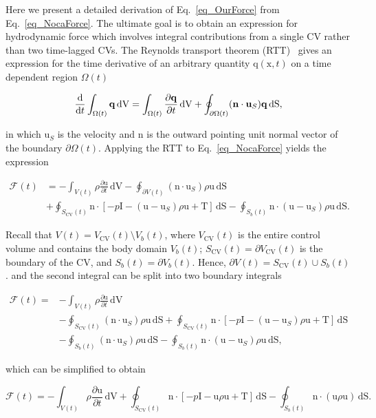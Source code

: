 \documentclass[review]{elsarticle}
\renewcommand \d [2]{\frac{{\rm d} #1}{{\rm d} #2}}
\newcommand \D [2]{\frac{\partial #1}{\partial #2}}
\renewcommand{\vec}[1]{\bm{\mathrm{#1}}}
\def \x{\vec{x}}
\def \q{\vec{q}}
\def \n{\vec{n}}
\def \u{\vec{u}}
\def \uS{\vec{u}_S}
\def \I{\vec{I}}
\def \T{\vec{T}}
\def \Sbt{S_b(t)}
\def  \Scvt{S_\text{CV}(t)}
\def \Vt{V(t)}
\def \Vbt{V_b(t)}
\def  \Vcvt{V_\text{CV}(t)}
\def \cF{\vec{\mathcal{F}}}
\def \I{\vec{I}}
\def \Omegat{\Omega(t)}
\def \n{\vec{n}}
\def \u{\vec{u}}
\def \x{\vec{x}}
\def \dS{\,\mathrm{dS}}
\def \dV{\,\mathrm{dV}}
\def \ndot{\n \cdot}
\begin{document}
Here we present a detailed derivation of Eq.~\eqref{eq_OurForce} from  
Eq.~\eqref{eq_NocaForce}. The ultimate goal is to obtain an expression
for hydrodynamic force which involves integral contributions from a 
single CV rather than two time-lagged CVs. The Reynolds transport 
theorem (RTT)~\cite{Kundu14,Pozrikidis11} gives an expression for the time 
derivative of an arbitrary quantity $\q(\x,t)$ on a time dependent region $\Omegat$

\begin{equation}
\label{eq_RTT}
\d{}{t} \int_{\Omegat} \q \dV =
\int_{\Omegat} \D{\q}{t} \dV
+ \oint_{\partial \Omegat} (\ndot \uS) \q \dS,
\end{equation}

\noindent in which $\uS$ is the velocity and $\n$ is the outward pointing
unit normal vector of the boundary $\partial \Omegat$.
Applying the RTT to Eq.~\eqref{eq_NocaForce} yields the expression
 
 
\begin{align}
\cF(t) &= 
-\int_{\Vt} \rho \D{\u}{t} \dV 
- \oint_{\partial \Vt} (\ndot \uS) \rho \u \dS  \nonumber \\
& + \oint_{\Scvt} \ndot \left[-p \I - (\u-\uS)\rho \u + \T \right] \dS 
- \oint_{\Sbt} \ndot (\u-\uS)\rho \u \dS.
\end{align}


\noindent Recall that $\Vt = \Vcvt \setminus \Vbt$, where $\Vcvt$ is the entire
control volume and contains the body domain $\Vbt$; $\Scvt = \partial \Vcvt$ is the
boundary of the CV, and $\Sbt = \partial \Vbt$. Hence, $\partial \Vt = \Scvt \cup \Sbt$.
and the second integral can be split into two boundary integrals

\begin{align}
\cF(t) = \nonumber
& -\int_{\Vt} \rho \D{\u}{t} \dV \\
&- \oint_{\Scvt} (\ndot \uS) \rho \u \dS 
+ \oint_{\Scvt} \ndot \left[-p \I - (\u-\uS)\rho \u + \T \right] \dS  \\
& - \oint_{\Sbt} (\ndot \uS) \rho \u \dS \nonumber
- \oint_{\Sbt} \ndot (\u-\uS)\rho \u \dS,
\end{align}

\noindent which can be simplified to obtain

\begin{equation}
\label{eq_simplified_drag}
\cF(t) = 
 -\int_{\Vt} \rho \D{\u}{t} \dV
 + \oint_{\Scvt} \ndot \left[-p \I - \u \rho \u + \T \right] \dS 
 - \oint_{\Sbt} \ndot (\u \rho \u) \dS.
\end{equation}
\end{document}
